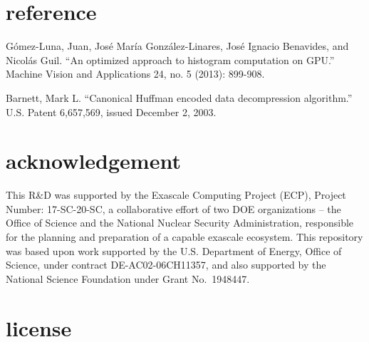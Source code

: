 \section{reference}

\begin{description}
\tightlist
\item[{[}1{]}]
Gómez-Luna, Juan, José María González-Linares, José Ignacio Benavides,
and Nicolás Guil. ``An optimized approach to histogram computation on
GPU.'' Machine Vision and Applications 24, no. 5 (2013): 899-908.
\item[{[}2{]}]
Barnett, Mark L. ``Canonical Huffman encoded data decompression
algorithm.'' U.S. Patent 6,657,569, issued December 2, 2003.
\end{description}

\section{acknowledgement}

This R\&D was supported by the Exascale Computing Project (ECP), Project
Number: 17-SC-20-SC, a collaborative effort of two DOE organizations --
the Office of Science and the National Nuclear Security Administration,
responsible for the planning and preparation of a capable exascale
ecosystem. This repository was based upon work supported by the U.S.
Department of Energy, Office of Science, under contract
DE-AC02-06CH11357, and also supported by the National Science Foundation
under Grant No.~1948447.

\section{license}

